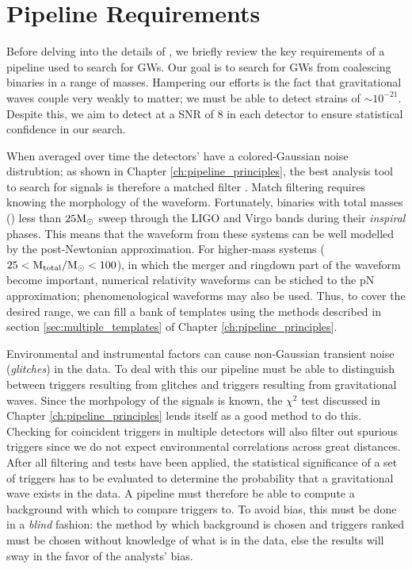\section{Pipeline Requirements}
\label{sec:PipelineRequirements}

Before delving into the details of \ihope, we briefly review the key
requirements of a pipeline used to search for \ac{GW}s. Our goal is to search
for \ac{GW}s from coalescing binaries in a range of masses. Hampering our
efforts is the fact that gravitational waves couple very weakly to matter; we
must be able to detect strains of $\sim10^{-21}$. Despite this, we
aim to detect at a \ac{SNR} of $8$ in each detector to ensure statistical
confidence in our search.

When averaged over time the detectors' have a colored-Gaussian noise
distrubtion; as shown in Chapter \ref{ch:pipeline_principles}, the best analysis tool to search for signals is therefore a
matched filter \cite{?}. Match filtering requires knowing the morphology of the
waveform. Fortunately, binaries with total masses (\mtotal) less than $25\mathrm{M_\odot}$
sweep through the \ac{LIGO} and Virgo bands during their {\it inspiral} phases.
This means that the waveform from these systems can be well modelled by the
post-Newtonian approximation. For higher-mass systems ($25 < \mathrm{M_{total}}/\mathrm{M_\odot} <
100$), in which the merger and ringdown part of the waveform become important,
numerical relativity waveforms can be stiched to the \ac{pN} approximation;
phenomenological waveforms may also be used. Thus, to cover the desired range,
we can fill a bank of templates using the methods described in section \ref{sec:multiple_templates} of Chapter \ref{ch:pipeline_principles}.

Environmental and instrumental factors can cause non-Gaussian transient noise
(\emph{glitches}) in the data. To deal with this our pipeline must be able to
distinguish between triggers resulting from glitches and triggers resulting
from gravitational waves. Since the morhpology of the signals is known, the
$\chi^2$ test discussed in Chapter \ref{ch:pipeline_principles} lends itself as
a good method to do this. Checking for coincident triggers in multiple
detectors will also filter out spurious triggers since we do not expect
environmental correlations across great distances. After all filtering and
tests have been applied, the statistical significance of a set of triggers has
to be evaluated to determine the probability that a gravitational wave exists
in the data. A pipeline must therefore be able to compute a background with
which to compare triggers to. To avoid bias, this must be done in a {\it blind}
fashion: the method by which background is chosen and triggers ranked must be
chosen without knowledge of what is in the data, else the results will sway in
the favor of the analysts' bias. 

